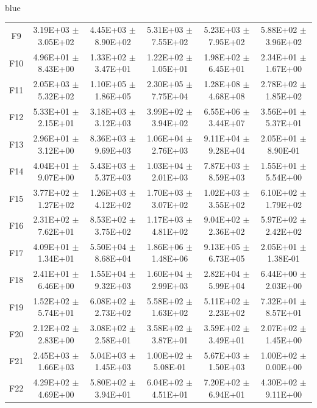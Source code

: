 \documentclass[journal, onecolumn]{IEEEtran}
\begin{document}
\begin{color}{blue}
\begin{table}[htbp!]
\begin{tabular}{c|ccccc}
			F9	 &	3.19E+03	$\pm$	3.05E+02		 &	4.45E+03	$\pm$	8.90E+02		 &	5.31E+03	$\pm$	7.55E+02		 &	5.23E+03	$\pm$	7.95E+02		 &	5.88E+02	$\pm$	3.96E+02	\\
			F10	 &	4.96E+01	$\pm$	8.43E+00		 &	1.33E+02	$\pm$	3.47E+01		 &	1.22E+02	$\pm$	1.05E+01		 &	1.98E+02	$\pm$	6.45E+01		 &	2.34E+01	$\pm$	1.67E+00	\\
			F11	 &	2.05E+03	$\pm$	5.32E+02		 &	1.10E+05	$\pm$	1.86E+05		 &	2.30E+05	$\pm$	7.75E+04		 &	1.28E+08	$\pm$	4.68E+08		 &	2.78E+02	$\pm$	1.85E+02	\\
			F12	 &	5.33E+01	$\pm$	2.15E+01		 &	3.18E+03	$\pm$	3.12E+03		 &	3.99E+02	$\pm$	3.94E+02		 &	6.55E+06	$\pm$	3.44E+07		 &	3.56E+01	$\pm$	5.37E+01	\\
			F13	 &	2.96E+01	$\pm$	3.12E+00		 &	8.36E+03	$\pm$	9.69E+03		 &	1.06E+04	$\pm$	2.76E+03		 &	9.11E+04	$\pm$	9.28E+04		 &	2.05E+01	$\pm$	8.90E-01	\\
			F14	 &	4.04E+01	$\pm$	9.07E+00		 &	5.43E+03	$\pm$	5.37E+03		 &	1.03E+04	$\pm$	2.01E+03		 &	7.87E+03	$\pm$	8.59E+03		 &	1.55E+01	$\pm$	5.54E+00	\\
			F15	 &	3.77E+02	$\pm$	1.27E+02		 &	1.26E+03	$\pm$	4.12E+02		 &	1.70E+03	$\pm$	3.07E+02		 &	1.02E+03	$\pm$	3.55E+02		 &	6.10E+02	$\pm$	1.79E+02	\\
			F16	 &	2.31E+02	$\pm$	7.62E+01		 &	8.53E+02	$\pm$	3.75E+02		 &	1.17E+03	$\pm$	4.81E+02		 &	9.04E+02	$\pm$	2.36E+02		 &	5.97E+02	$\pm$	2.42E+02	\\
			F17	 &	4.09E+01	$\pm$	1.34E+01		 &	5.50E+04	$\pm$	8.68E+04		 &	1.86E+06	$\pm$	1.48E+06		 &	9.13E+05	$\pm$	6.73E+05		 &	2.05E+01	$\pm$	1.38E-01	\\
			F18	 &	2.41E+01	$\pm$	6.46E+00		 &	1.55E+04	$\pm$	9.32E+03		 &	1.60E+04	$\pm$	2.99E+03		 &	2.82E+04	$\pm$	5.99E+04		 &	6.44E+00	$\pm$	2.03E+00	\\
			F19	 &	1.52E+02	$\pm$	5.74E+01		 &	6.08E+02	$\pm$	2.73E+02		 &	5.58E+02	$\pm$	1.63E+02		 &	5.11E+02	$\pm$	2.23E+02		 &	7.32E+01	$\pm$	8.57E+01	\\
			F20	 &	2.12E+02	$\pm$	2.83E+00		 &	3.08E+02	$\pm$	2.58E+01		 &	3.58E+02	$\pm$	3.87E+01		 &	3.59E+02	$\pm$	3.49E+01		 &	2.07E+02	$\pm$	1.45E+00	\\
			F21	 &	2.45E+03	$\pm$	1.66E+03		 &	5.04E+03	$\pm$	1.45E+03		 &	1.00E+02	$\pm$	5.08E-01		 &	5.67E+03	$\pm$	1.50E+03		 &	1.00E+02	$\pm$	0.00E+00	\\
			F22	 &	4.29E+02	$\pm$	4.69E+00		 &	5.80E+02	$\pm$	3.94E+01		 &	6.04E+02	$\pm$	4.51E+01		 &	7.20E+02	$\pm$	6.94E+01		 &	4.30E+02	$\pm$	9.11E+00	\\

\end{tabular}
\end{table}
\end{color}
\end{document}
